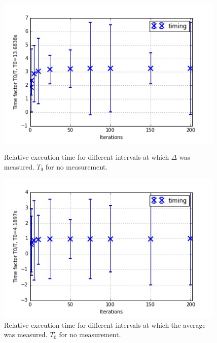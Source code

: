 \documentclass[11pt]{article}
\begin{document}
	\begin{figure}[ht]	
		\centering
		\begin{minipage}[b]{.5\textwidth}	
			\centering
			\includegraphics[width=\linewidth]{itervs4.jpeg}
			\caption{Relative execution time for different intervals at which $\Delta$ was measured. $T_0$ for no measurement.}\label{iter4}
		\end{minipage}%
		\begin{minipage}[b]{.5\textwidth}
			\centering
			\includegraphics[width=\linewidth]{itervs5.jpeg}
			\caption{Relative execution time for different intervals at which the average was measured. $T_0$ for no measurement.}\label{iter5}
		\end{minipage}
	\end{figure}
	
\end{document}
